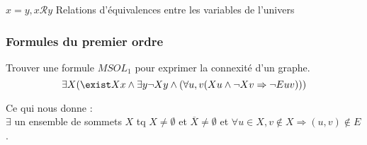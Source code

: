 \documentclass[a4paper, 11pt]{report}
\begin{document}
$x=y, x\mathcal{R}y$ Relations d'équivalences entre les variables de l'univers

\subsubsection{Formules du premier ordre}


\begin{exo}
    Trouver une formule $MSOL_1$ pour exprimer la connexité d'un graphe.\\

    \begin{displaymath}
        \exists X (\exist Xx \wedge \exists y \neg Xy \wedge (\forall u,v (Xu \wedge \neg Xv \Rightarrow
        \neg E uv ))) 
    \end{displaymath}

    Ce qui nous donne : \\
    $\exists$ un ensemble de sommets $X$ tq $X \neq \emptyset$ et $\overline{X} \neq \emptyset$ et
    $\forall u \in X, v \not \in X \Rightarrow (u,v) \not \in E$.
\end{exo}
\end{document}
